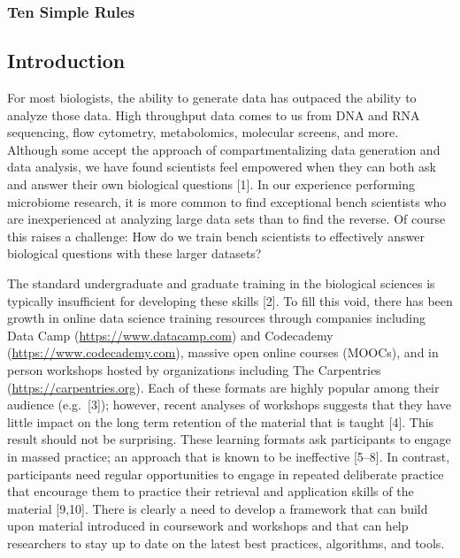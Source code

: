 \documentclass[
  11pt,
]{article}
\begin{document}
\vspace{5mm}

\hypertarget{ten-simple-rules}{%
\subsubsection{Ten Simple Rules}\label{ten-simple-rules}}

\newpage
\linenumbers

\hypertarget{introduction}{%
\subsection{Introduction}\label{introduction}}

For most biologists, the ability to generate data has outpaced the
ability to analyze those data. High throughput data comes to us from DNA
and RNA sequencing, flow cytometry, metabolomics, molecular screens, and
more. Although some accept the approach of compartmentalizing data
generation and data analysis, we have found scientists feel empowered
when they can both ask and answer their own biological questions
{[}1{]}. In our experience performing microbiome research, it is more
common to find exceptional bench scientists who are inexperienced at
analyzing large data sets than to find the reverse. Of course this
raises a challenge: How do we train bench scientists to effectively
answer biological questions with these larger datasets?

The standard undergraduate and graduate training in the biological
sciences is typically insufficient for developing these skills {[}2{]}.
To fill this void, there has been growth in online data science training
resources through companies including Data Camp
(\url{https://www.datacamp.com}) and Codecademy
(\url{https://www.codecademy.com}), massive open online courses (MOOCs),
and in person workshops hosted by organizations including The
Carpentries (\url{https://carpentries.org}). Each of these formats are
highly popular among their audience (e.g.~{[}3{]}); however, recent
analyses of workshops suggests that they have little impact on the long
term retention of the material that is taught {[}4{]}. This result
should not be surprising. These learning formats ask participants to
engage in massed practice; an approach that is known to be ineffective
{[}5--8{]}. In contrast, participants need regular opportunities to
engage in repeated deliberate practice that encourage them to practice
their retrieval and application skills of the material {[}9,10{]}. There
is clearly a need to develop a framework that can build upon material
introduced in coursework and workshops and that can help researchers to
stay up to date on the latest best practices, algorithms, and tools.
\end{document}
